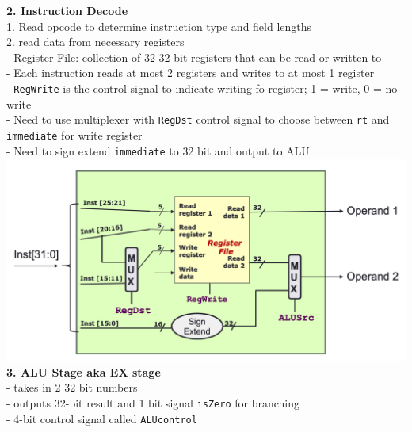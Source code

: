 \documentclass[10pt, a4paper]{article}
\begin{document}
\begin{multicols*}{3}
		\textbf{2. Instruction Decode}\\
		1. Read opcode to determine instruction type and field lengths\\
		2. read data from necessary registers\\
		- Register File: collection of 32 32-bit registers that can be read or written to\\
		- Each instruction reads at most 2 registers and writes to at most 1 register\\
		- \texttt{RegWrite} is the control signal to indicate writing fo register; 1 = write, 0 = no write\\
		- Need to use multiplexer with \texttt{RegDst} control signal to choose between \texttt{rt} and \texttt{immediate} for write register\\
		- Need to sign extend \texttt{immediate} to 32 bit and output to ALU\\
		\includegraphics[scale=.27]{./assets/decodeStage}\\
		
		\textbf{3. ALU Stage aka EX stage}\\
		- takes in 2 32 bit numbers\\
		- outputs 32-bit result and 1 bit signal \texttt{isZero} for branching\\
		- 4-bit control signal called \texttt{ALUcontrol}\\
		

\end{multicols*}
\end{document}
